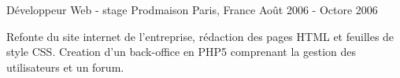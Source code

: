 \cventry
{Développeur Web - stage} %
{Prodmaison} %
{Paris, France} %
{Août 2006 - Octore 2006} %
{
\begin{cvitems} %
    \item
    {
        Refonte du site internet de l'entreprise, rédaction des pages HTML et feuilles de style CSS.
        Creation d'un back-office en PHP5 comprenant la gestion des utilisateurs et un forum.
    }
\end{cvitems}
}
